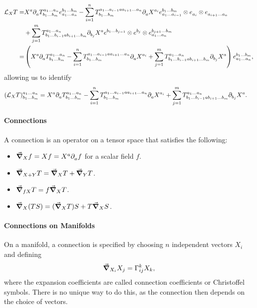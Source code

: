 \begin{align*}
	\lied{X}{T} =& X^{a}\del{a}{\tensor*{T}{^{a_{1}\dots a_{n}}_{b_{1}\dots b_{m}}}}\tensor*{e}{^{b_{1}\dots b_{m}}_{a_{1}\dots a_{n}}} - \sum\limits_{i = 1}^{n}\tensor*{T}{^{a_{1}\dots a_{i - 1}aa_{i + 1}\dots a_{n}}_{b_{1}\dots b_{m}}}\del{a}{X^{a_{i}}}\tensor*{e}{^{b_{1}\dots b_{m}}_{a_{1}\dots a_{i - 1}}}\otimes\tensor*{e}{_{a_{i}}}\otimes\tensor*{e}{_{a_{i + 1}\dots a_{n}}} \\
	             &+ \sum\limits_{j = 1}^{m}\tensor*{T}{^{a_{1}\dots a_{n}}_{b_{1}\dots b_{i - 1}ab_{i + 1}\dots b_{m}}}\del{b_{j}}{X^{a}}\tensor*{e}{^{b_{1}\dots b_{j - 1}}}\otimes\tensor*{e}{^{b_{j}}}\otimes\tensor*{e}{^{b_{j + 1}\dots b_{m}}_{a_{1}\dots a_{n}}} \\
	            =& \left(X^{a}\del{a}{\tensor*{T}{^{a_{1}\dots a_{n}}_{b_{1}\dots b_{m}}}} - \sum\limits_{i = 1}^{n}\tensor*{T}{^{a_{1}\dots a_{i - 1}aa_{i + 1}\dots a_{n}}_{b_{1}\dots b_{m}}}\del{a}{X^{a_{i}}} + \sum\limits_{j = 1}^{m}\tensor*{T}{^{a_{1}\dots a_{n}}_{b_{1}\dots b_{i - 1}ab_{i + 1}\dots b_{m}}}\del{b_{j}}{X^{a}}\right)\tensor*{e}{^{b_{1}\dots b_{m}}_{a_{1}\dots a_{n}}},
\end{align*}
allowing us to identify
\begin{align*}
\tensor*{(\lied{X}{T})}{^{a_{1}\dots a_{n}}_{b_{1}\dots b_{m}}} &= X^{a}\del{a}{\tensor*{T}{^{a_{1}\dots a_{n}}_{b_{1}\dots b_{m}}}} - \sum\limits_{i = 1}^{n}\tensor*{T}{^{a_{1}\dots a_{i - 1}aa_{i + 1}\dots a_{n}}_{b_{1}\dots b_{m}}}\del{a}{X^{a_{i}}} + \sum\limits_{j = 1}^{m}\tensor*{T}{^{a_{1}\dots a_{n}}_{b_{1}\dots b_{i - 1}ab_{i + 1}\dots b_{m}}}\del{b_{j}}{X^{a}}.
\end{align*}

\paragraph{Connections}
A connection is an operator on a tensor space that satisfies the following:
\begin{itemize}
	\item $\grad_{X}{f} = Xf = X^{a}\partial^{}_{a}f$ for a scalar field $f$.
	\item $\grad_{X + Y}{T} = \grad_{X}{T} + \grad_{Y}{T}$.
	\item $\grad_{fX}{T} = f\grad_{X}{T}$.
	\item $\grad_{X}{(TS)} = (\grad_{X}{T})S + T\grad_{X}{S}$.
\end{itemize}

\paragraph{Connections on Manifolds}
On a manifold, a connection is specified by choosing $n$ independent vectors $X_{i}$ and defining
\begin{align*}
	\dcov{X_{i}}{X_{j}} = \chris{k}{i}{j}X_{k},
\end{align*}
where the expansion coefficients are called connection coefficients or Christoffel symbols. There is no unique way to do this, as the connection then depends on the choice of vectors.

